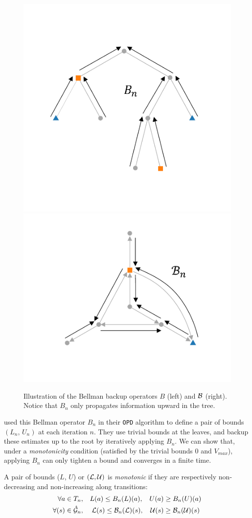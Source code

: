 \documentclass[runningheads]{llncs}
\begin{document}
\begin{figure}[tp]
	\centering
	\includegraphics[trim={2.0cm 2.9cm 2.5cm 3.1cm}, clip,width=0.44\linewidth]{img/tree_2}
	\hfill
	\includegraphics[trim={2.7cm 2.7cm 2.7cm 1.1cm}, clip,width=0.44\linewidth]{img/graph_2}
	\caption{Illustration of the Bellman backup operators $B$ (left) and $\mathcal{B}$ (right). Notice that $B_n$ only propagates information upward in the tree.}
	\label{fig:bellman}
\end{figure}

\citet{Hren2008optimistic} used this Bellman operator $B_n$ in their \texttt{OPD} algorithm to define a pair of bounds $(L_n,\, U_n)$ at each iteration $n$. They use trivial bounds at the leaves, and backup these estimates up to the root by iteratively applying $B_n$. We can show that, under a \textit{monotonicity} condition (satisfied by the trivial bounds $0$ and $V_{max}$), applying $B_n$ can only tighten a bound and converges in a finite time.

\begin{definition}[Monotonicity]
	A pair of bounds ($L$, $U$) or $(\mathcal{L}, \mathcal{U})$ is \emph{monotonic} if they are respectively non-decreasing and non-increasing along transitions:
	\begin{align*}
	\forall a\in{T}_n, \quad & L(a) \leq B_n(L)(a), & U(a) & \geq B_n(U)(a)\\
	\forall (s)\in\mathring{\mathcal{G}}_n, \quad &\; \mathcal{L}(s) \leq \mathcal{B}_n(\mathcal{L})(s),&   \mathcal{U}(s) & \geq \mathcal{B}_n(\mathcal{U})(s)
	\end{align*}
\end{definition}
\end{document}
